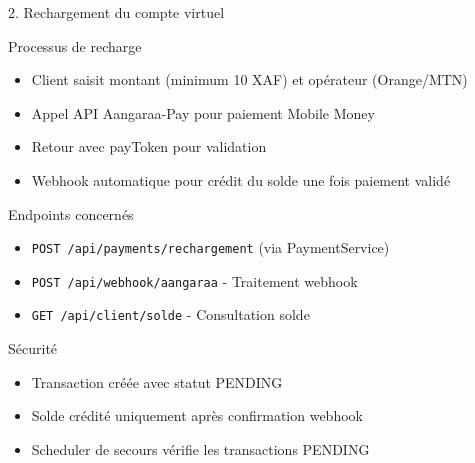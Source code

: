\documentclass[aspectratio=169,9pt,demo]{beamer}
\begin{document}
\begin{frame}{2. Rechargement du compte virtuel}
\begin{block}{Processus de recharge}
\begin{itemize}
    \item Client saisit montant (minimum 10 XAF) et opérateur (Orange/MTN)
    \item Appel API Aangaraa-Pay pour paiement Mobile Money
    \item Retour avec payToken pour validation
    \item Webhook automatique pour crédit du solde une fois paiement validé
\end{itemize}
\end{block}

\begin{block}{Endpoints concernés}
\begin{itemize}
    \item \texttt{POST /api/payments/rechargement} (via PaymentService)
    \item \texttt{POST /api/webhook/aangaraa} - Traitement webhook
    \item \texttt{GET /api/client/solde} - Consultation solde
\end{itemize}
\end{block}

\begin{block}{Sécurité}
\begin{itemize}
    \item Transaction créée avec statut PENDING
    \item Solde crédité uniquement après confirmation webhook
    \item Scheduler de secours vérifie les transactions PENDING
\end{itemize}
\end{block}
\end{frame}
\end{document}
